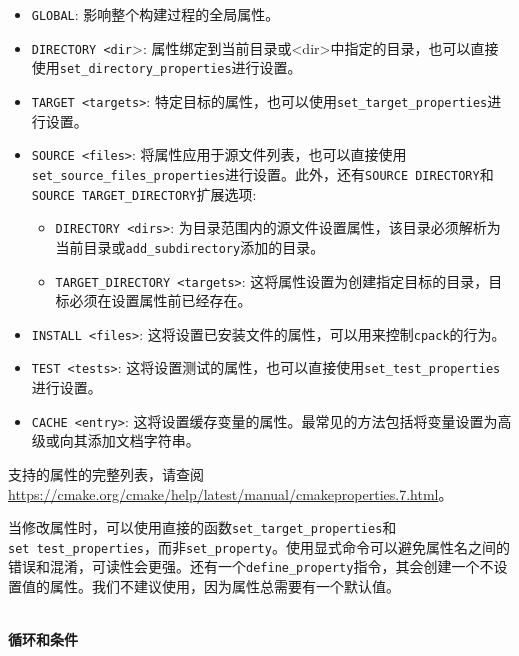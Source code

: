 \begin{itemize}
\item 
\texttt{GLOBAL}: 影响整个构建过程的全局属性。

\item 
\texttt{DIRECTORY <dir}>: 属性绑定到当前目录或<dir>中指定的目录，也可以直接使用\texttt{set\_directory\_properties}进行设置。

\item 
\texttt{TARGET <targets>}: 特定目标的属性，也可以使用\texttt{set\_target\_properties}进行设置。

\item 
\texttt{SOURCE <files>}: 将属性应用于源文件列表，也可以直接使用\texttt{set\_source\_files\_properties}进行设置。此外，还有\texttt{SOURCE DIRECTORY}和\texttt{SOURCE TARGET\_DIRECTORY}扩展选项:

\begin{itemize}
\item 
\texttt{DIRECTORY <dirs>}: 为目录范围内的源文件设置属性，该目录必须解析为当前目录或\texttt{add\_subdirectory}添加的目录。

\item 
\texttt{TARGET\_DIRECTORY <targets>}: 这将属性设置为创建指定目标的目录，目标必须在设置属性前已经存在。
\end{itemize}

\item 
\texttt{INSTALL <files>}: 这将设置已安装文件的属性，可以用来控制\texttt{cpack}的行为。

\item 
\texttt{TEST <tests>}: 这将设置测试的属性，也可以直接使用\texttt{set\_test\_properties}进行设置。

\item 
\texttt{CACHE <entry>}: 这将设置缓存变量的属性。最常见的方法包括将变量设置为高级或向其添加文档字符串。
\end{itemize}

支持的属性的完整列表，请查阅\url{https://cmake.org/cmake/help/latest/manual/cmakeproperties.7.html}。

当修改属性时，可以使用直接的函数\texttt{set\_target\_properties}和\texttt{set\ test\_properties}，而非\texttt{set\_property}。使用显式命令可以避免属性名之间的错误和混淆，可读性会更强。还有一个\texttt{define\_property}指令，其会创建一个不设置值的属性。我们不建议使用，因为属性总需要有一个默认值。

\hspace*{\fill} \\ %
\noindent
\textbf{循环和条件}

